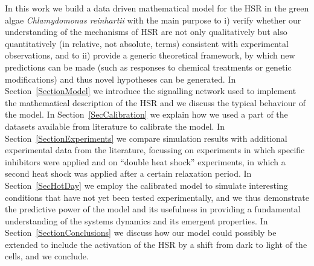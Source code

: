 \documentclass[oneside, 10pt, a4paper, twocolumn]{article}
\begin{document}
In this work we build a data driven mathematical model for the HSR in the green algae \emph{Chlamydomonas reinhartii}
with the main purpose to i) verify whether our understanding of the mechanisms of HSR are not only qualitatively but also quantitatively (in relative, not absolute, terms) consistent with experimental observations,
and to ii) provide a generic theoretical framework, by which new predictions can be made (such as responses to chemical treatments or genetic modifications) 
and thus novel hypotheses can be generated.
In Section~\ref{SectionModel} we introduce the signalling network used to implement the mathematical description of the HSR 
and we discuss the typical behaviour of the model.
In Section~\ref{SecCalibration} we explain how we used a part of the datasets available from literature to calibrate the model. 
In Section~\ref{SectionExperiments} we compare simulation results with additional experimental data from the literature,
focussing on experiments in which specific inhibitors were applied and on ``double heat shock'' experiments, 
in which a second heat shock was applied after a certain relaxation period. 
In Section~\ref{SecHotDay} we employ the calibrated model to simulate interesting conditions that have not yet been 
tested experimentally, and we thus demonstrate the predictive power of the model and its usefulness in providing a fundamental understanding of the 
systems dynamics and its emergent properties. 
In %
Section~\ref{SectionConclusions} 
we discuss how our model could possibly be extended to include the activation of the HSR by a shift from dark to light of the cells, and we conclude.
\end{document}
